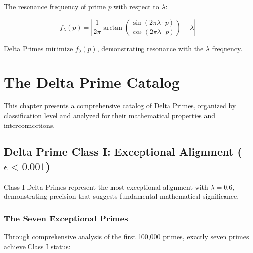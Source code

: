 \documentclass[12pt,a4paper]{report}
\newcommand{\lambdaval}{\lambda}
\begin{document}
The resonance frequency of prime $p$ with respect to $\lambdaval$:

\[
f_{\lambdaval}(p) = \left| \frac{1}{2\pi} \arctan\left(\frac{\sin(2\pi \lambdaval \cdot p)}{\cos(2\pi \lambdaval \cdot p)}\right) - \lambdaval \right|
\]

Delta Primes minimize $f_{\lambdaval}(p)$, demonstrating resonance with the $\lambdaval$ frequency.

\chapter{The Delta Prime Catalog}

This chapter presents a comprehensive catalog of Delta Primes, organized by classification level and analyzed for their mathematical properties and interconnections.

\section{Delta Prime Class I: Exceptional Alignment ($\epsilon < 0.001$)}

Class I Delta Primes represent the most exceptional alignment with $\lambdaval = 0.6$, demonstrating precision that suggests fundamental mathematical significance.

\subsection{The Seven Exceptional Primes}

Through comprehensive analysis of the first 100,000 primes, exactly seven primes achieve Class I status:
\end{document}

